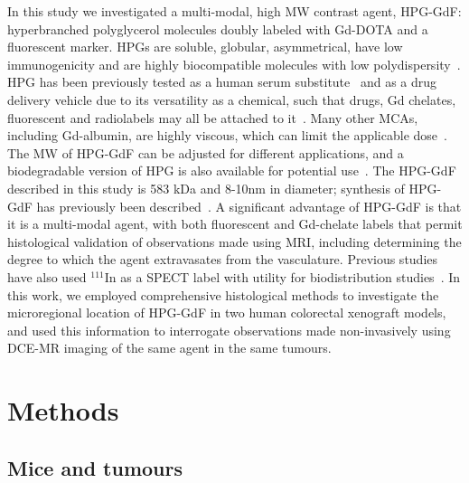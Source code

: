 In this study we investigated a multi-modal, high \acs{MW} contrast agent, \acs{HPG-GdF}: hyperbranched polyglycerol molecules doubly labeled with Gd-DOTA and a fluorescent marker.
HPGs are soluble, globular, asymmetrical, have low immunogenicity and are highly biocompatible molecules with low polydispersity~\cite{Saatchi:2012hc,Kainthan:2006ce,Saatchi:2012gc}.
HPG has been previously tested as a human serum substitute~\cite{Kainthan:2008ek} and as a drug delivery vehicle due to its versatility as a chemical, such that drugs, Gd chelates, fluorescent and radiolabels may all be attached to it~\cite{Shenoi:2013id}.
Many other \acs{MCA}s, including Gd-albumin, are highly viscous, which can limit the applicable dose~\cite{Imranulhaq:2012ij}.
The \acs{MW} of \acs{HPG-GdF} can be adjusted for different applications, and a biodegradable version of HPG is also available for potential use~\cite{Shenoi:2013id}.
The \acs{HPG-GdF} described in this study is 583 \acs{kDa} and 8-10nm in diameter; synthesis of \acs{HPG-GdF} has previously been described~\cite{Saatchi:2012hc}.
A significant advantage of \acs{HPG-GdF} is that it is a multi-modal agent, with both fluorescent and Gd-chelate labels that permit histological validation of observations made using MRI, including determining the degree to which the agent extravasates from the vasculature.
Previous studies have also used $^{111}$In as a SPECT label with utility for biodistribution studies~\cite{Saatchi:2012hc}.
In this work, we employed comprehensive histological methods to investigate the microregional location of \acs{HPG-GdF} in two human colorectal xenograft models, and used this information to interrogate observations made non-invasively using DCE-MR imaging of the same agent in the same tumours.

\section{Methods}
\label{hpgpaper1_methods}
\subsection{Mice and tumours}

